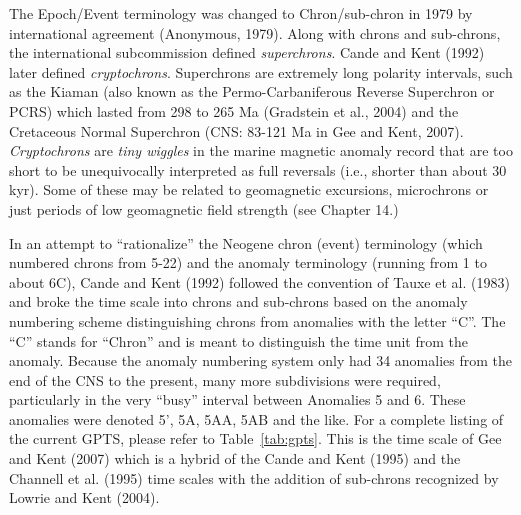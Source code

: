 The Epoch/Event terminology was changed to Chron/sub-chron in 1979 by international agreement (Anonymous, 1979).  \nocite{anonymous79}  Along with chrons and sub-chrons, the international subcommission defined 
{\it superchrons}.  
Cande and Kent (1992) later defined  \nocite{cande92} 
{\it cryptochrons}.  Superchrons are extremely long polarity intervals, such as the Kiaman (also known as the  
Permo-Carbaniferous Reverse Superchron or PCRS) which lasted from 298 to 265 Ma 
(Gradstein et al., 2004) and the \nocite{gradstein04} Cretaceous Normal Superchron (CNS: 83-121 Ma in 
Gee and Kent, 2007). \nocite{gee07}   
{\it Cryptochrons} are 
{\it tiny wiggles} in the marine magnetic anomaly record that are too short to be unequivocally interpreted as full reversals (i.e., shorter than about 30 kyr).  Some of these may be related to 
geomagnetic excursions, microchrons  or just periods of low geomagnetic field strength (see Chapter 14.)     



In an attempt to ``rationalize'' the Neogene chron (event) terminology (which numbered chrons from 5-22) and the anomaly terminology (running from 1 to about 6C),  
Cande and Kent (1992) \nocite{cande92}  followed the convention of 
Tauxe et al. (1983) \nocite{tauxe83}   and broke the time scale into chrons and sub-chrons based on the anomaly numbering scheme distinguishing chrons from anomalies with the letter ``C''.     The ``C'' stands for ``Chron'' and is meant to distinguish the time unit from the anomaly.   Because the anomaly numbering system only had 34 anomalies from the end of the CNS to the present, many more subdivisions were required, particularly in the very ``busy'' interval between Anomalies 5 and 6.  These anomalies were denoted 5',  5A, 5AA, 5AB and the like.   
For a complete listing of the current GPTS, please refer to Table~\ref{tab:gpts}.     This is the time scale of
 Gee and Kent (2007) which is a hybrid of the Cande and Kent (1995) and the 
 Channell et al. (1995) time scales with the addition of sub-chrons  recognized by 
 \nocite{lowrie04}
 Lowrie and Kent (2004). 

